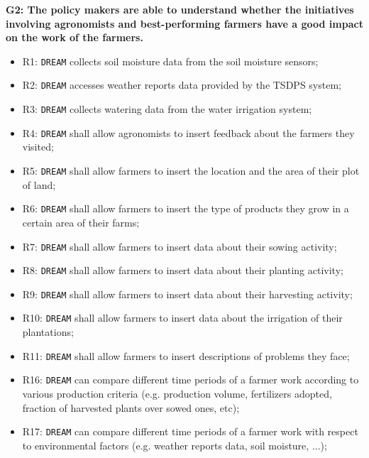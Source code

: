 \documentclass{article}
\begin{document}
\vspace{5mm}
\textbf{G2: The policy makers are able to understand whether the initiatives involving agronomists and best-performing farmers have a good impact on the work of the farmers.}
\begin{itemize}
    \item R1: \verb|DREAM| collects soil moisture data from the soil moisture sensors;
    \item R2: \verb|DREAM| accesses weather reports data provided by the TSDPS system;

    \item R3: \verb|DREAM| collects watering data from the water irrigation system;

    \item R4: \verb|DREAM| shall allow agronomists to insert feedback about the farmers they visited;

    \item R5: \verb|DREAM| shall allow farmers to insert the location and the area of their plot of land;

    \item R6: \verb|DREAM| shall allow farmers to insert the type of products they grow in a certain area of their farms;

    \item R7: \verb|DREAM| shall allow farmers to insert data about their sowing activity;

    \item R8: \verb|DREAM| shall allow farmers to insert data about their planting activity;
    
    \item R9: \verb|DREAM| shall allow farmers to insert data about their harvesting activity;
    
    \item R10: \verb|DREAM| shall allow farmers to insert data about the irrigation of their plantations;
    
    \item R11: \verb|DREAM| shall allow farmers to insert descriptions of problems they face;

    \item R16: \verb|DREAM| can compare different time periods of a farmer work according to various production criteria (e.g. production volume, fertilizers adopted, fraction of harvested plants over sowed ones, etc);
  
    \item R17: \verb|DREAM| can compare different time periods of a  farmer work with respect to environmental factors (e.g. weather reports data, soil moisture, ...);


\end{itemize}
\end{document}
